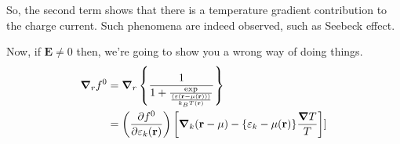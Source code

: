 \documentclass[a4paper]{article}
\begin{document}
So, the second term shows that there is a temperature gradient
contribution to the charge current. Such phenomena are indeed
observed, such as  Seebeck effect.

Now, if $ \mathbf{E}\neq  0$ then, we're going to show you a wrong
way of doing things.
\begin{equation}
	\begin{split}
		\grad_r f^{0} &= \grad_r \left\{ \frac{1}{1 + \frac{\exp}{\frac{\left( \varepsilon( \mathbf{r} - \mu( \mathbf{r})) \right) }{k_BT( \mathbf{r})}}} \right\} \\
			      &=  \left( \pdv{f^{0}}{\varepsilon_k(\textbf{r})} \right) \left[ \grad_k( \mathbf{r} - \mu ) - \{\varepsilon_k - \mu( \mathbf{r})\} \frac{\grad T}{T} \right] ] \\
	\end{split}
\end{equation}
\end{document}
